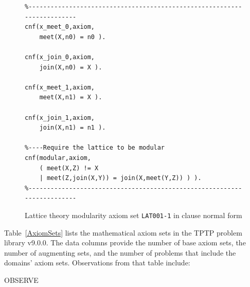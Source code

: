 \documentclass[runningheads]{llncs}
\newenvironment{packed_itemize}{
\vspace*{-0.2em}
\begin{itemize}
\setlength{\partopsep}{0pt}
\setlength{\itemsep}{1pt}
\setlength{\parskip}{0pt}
\setlength{\parsep}{0pt}
}{\end{itemize}}
\begin{document}
\begin{figure}[tb]
\centering
{\footnotesize
{\setlength{\baselineskip}{3mm}
\begin{verbatim}
%------------------------------------------------------------------------
cnf(x_meet_0,axiom,
    meet(X,n0) = n0 ).

cnf(x_join_0,axiom,
    join(X,n0) = X ).

cnf(x_meet_1,axiom,
    meet(X,n1) = X ).

cnf(x_join_1,axiom,
    join(X,n1) = n1 ).

%----Require the lattice to be modular
cnf(modular,axiom,
    ( meet(X,Z) != X
    | meet(Z,join(X,Y)) = join(X,meet(Y,Z)) ) ).
%------------------------------------------------------------------------
\end{verbatim}
}}
\caption{Lattice theory modularity axiom set {\tt LAT001-1} in clause normal form}
\label{ExampleAxioms1}
\end{figure}

Table~\ref{AxiomSets} lists the mathematical axiom sets in the TPTP problem library v9.0.0.
The data columns provide the number of base axiom sets, the number of augmenting sets, and
the number of problems that include the domains' axiom sets.
Observations from that table include:
\begin{packed_itemize}
\item OBSERVE
\end{packed_itemize}
\end{document}

